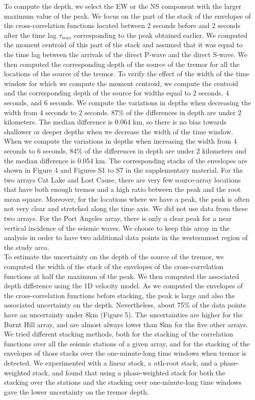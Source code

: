 \documentclass[draft]{agujournal2019}
\begin{document}
To compute the depth, we select the EW or the NS component with the larger maximum value of the peak. We focus on the part of the stack of the envelopes of the cross-correlation functions located between 2 seconds before and 2 seconds after the time lag $\tau_{max}$ corresponding to the peak obtained earlier. We computed the moment centroid of this part of the stack and assumed that it was equal to the time lag between the arrivals of the direct P-wave and the direct S-wave. We then computed the corresponding depth of the source of the tremor for all the locations of the source of the tremor. To verify the effect of the width of the time window for which we compute the moment centroid, we compute the centroid and the corresponding depth of the source for widths equal to 2 seconds, 4 seconds, and 6 seconds. We compute the variations in depths when decreasing the width from 4 seconds to 2 seconds. 87\% of the differences in depth are under 2 kilometers. The median difference is 0.064 km, so there is no bias towards shallower or deeper depths when we decrease the width of the time window. When we compute the variations in depths when increasing the width from 4 seconds to 6 seconds, 84\% of the differences in depth are under 2 kilometers and the median difference is 0.054 km. The corresponding stacks of the envelopes are shown in Figure 4 and Figures S1 to S7 in the supplementary material. For the two arrays Cat Lake and Lost Cause, there are very few source-array locations that have both enough tremor and a high ratio between the peak and the root mean square. Moreover, for the locations where we have a peak, the peak is often not very clear and stretched along the time axis. We did not use data from these two arrays. For the Port Angeles array, there is only a clear peak for a near vertical incidence of the seismic waves. We choose to keep this array in the analysis in order to have two additional data points in the westernmost region of the study area. \\

To estimate the uncertainty on the depth of the source of the tremor, we computed the width of the stack of the envelopes of the cross-correlation functions at half the maximum of the peak. We then computed the associated depth difference using the 1D velocity model. As we computed the envelopes of the cross-correlation functions before stacking, the peak is large and also the associated uncertainty on the depth. Nevertheless, about 75\% of the data points have an uncertainty under 8km (Figure 5). The uncertainties are higher for the Burnt Hill array, and are almost always lower than 8km for the five other arrays. We tried different stacking methods, both for the stacking of the correlation functions over all the seismic stations of a given array, and for the stacking of the envelopes of those stacks over the one-minute-long time windows when tremor is detected. We experimented with a linear stack, a $n$th-root stack, and a phase-weighted stack, and found that using a phase-weighted stack for both the stacking over the stations and the stacking over one-minute-long time windows gave the lower uncertainty on the tremor depth. \\
\end{document}
